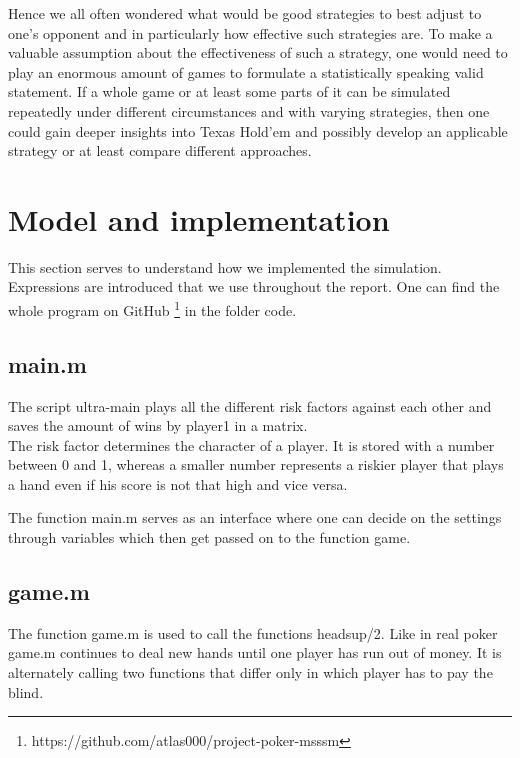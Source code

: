 \documentclass[11pt]{article}
\begin{document}
Hence we all often wondered what would be good strategies to best adjust to one’s opponent and in particularly how effective such strategies are. To make a valuable assumption about the effectiveness of such a strategy, one would need to play an enormous amount of games to formulate a statistically speaking valid statement. If a whole game or at least some parts of it can be simulated repeatedly under different circumstances and with varying strategies, then one could gain deeper insights into Texas Hold’em and possibly develop an applicable strategy or at least compare different approaches.


\section{Model and implementation}

This section serves to understand how we implemented the simulation. Expressions are introduced that we use throughout the report. One can find the whole program on GitHub \footnote{https://github.com/atlas000/project-poker-msssm} in the folder code. 

\subsection{main.m}

The script ultra-main plays all the different risk factors against each other and saves the amount of wins by player1 in a matrix.\\

The risk factor determines the character of a player. It is stored with a number between 0 and 1, whereas a smaller number represents a riskier player that plays a hand even if his score is not that high and vice versa.


The function main.m serves as an interface where one can decide on the settings through variables which then get passed on to the function game.

 

\subsection{game.m}

The function game.m is used to call the functions headsup/2. Like in real poker game.m continues to deal new hands until one player has run out of money. It is alternately calling two functions that differ only in which player has to pay the blind.\\
\end{document}
